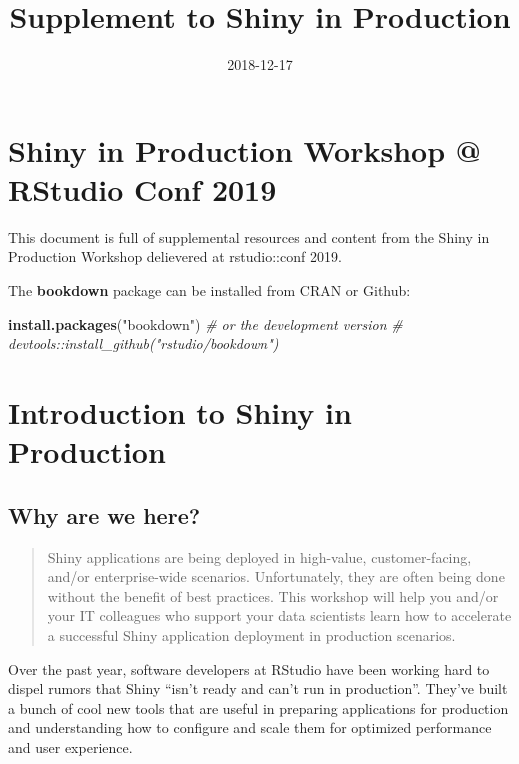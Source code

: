 \documentclass[]{book}
\title{Supplement to Shiny in Production}
\author{}
\date{2018-12-17}
\newenvironment{Shaded}{\begin{snugshade}}{\end{snugshade}}
\newcommand{\CommentTok}[1]{\textcolor[rgb]{0.56,0.35,0.01}{\textit{#1}}}
\newcommand{\KeywordTok}[1]{\textcolor[rgb]{0.13,0.29,0.53}{\textbf{#1}}}
\newcommand{\NormalTok}[1]{#1}
\newcommand{\StringTok}[1]{\textcolor[rgb]{0.31,0.60,0.02}{#1}}
\begin{document}
\maketitle

{
\setcounter{tocdepth}{1}
\tableofcontents
}
\hypertarget{shiny-in-production-workshop-rstudio-conf-2019}{%
\chapter{Shiny in Production Workshop @ RStudio Conf
2019}\label{shiny-in-production-workshop-rstudio-conf-2019}}

This document is full of supplemental resources and content from the
Shiny in Production Workshop delievered at rstudio::conf 2019.

The \textbf{bookdown} package can be installed from CRAN or Github:

\begin{Shaded}
\begin{Highlighting}[]
\KeywordTok{install.packages}\NormalTok{(}\StringTok{"bookdown"}\NormalTok{)}
\CommentTok{# or the development version}
\CommentTok{# devtools::install_github("rstudio/bookdown")}
\end{Highlighting}
\end{Shaded}

\hypertarget{course-intro}{%
\chapter{Introduction to Shiny in Production}\label{course-intro}}

\hypertarget{why-are-we-here}{%
\section{Why are we here?}\label{why-are-we-here}}

\begin{quote}
Shiny applications are being deployed in high-value, customer-facing,
and/or enterprise-wide scenarios. Unfortunately, they are often being
done without the benefit of best practices. This workshop will help you
and/or your IT colleagues who support your data scientists learn how to
accelerate a successful Shiny application deployment in production
scenarios.
\end{quote}

Over the past year, software developers at RStudio have been working
hard to dispel rumors that Shiny ``isn't ready and can't run in
production''. They've built a bunch of cool new tools that are useful in
preparing applications for production and understanding how to configure
and scale them for optimized performance and user experience.
\end{document}
